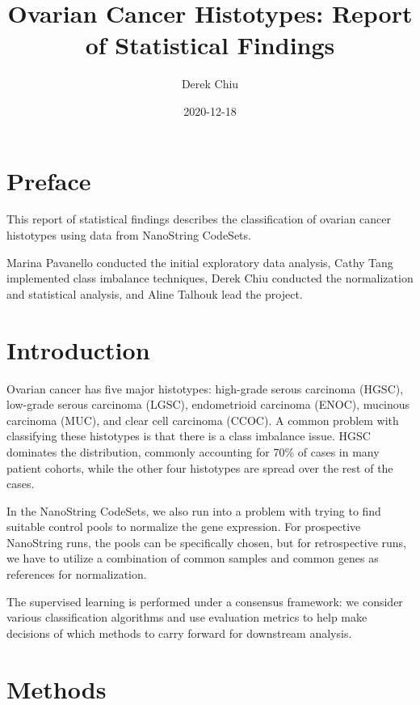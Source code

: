 \documentclass[
]{report}
\title{Ovarian Cancer Histotypes: Report of Statistical Findings}
\author{Derek Chiu}
\date{2020-12-18}
\begin{document}
\maketitle

{
\hypersetup{linkcolor=}
\setcounter{tocdepth}{1}
\tableofcontents
}
\listoftables
\listoffigures
\hypertarget{preface}{%
\chapter*{Preface}\label{preface}}

This report of statistical findings describes the classification of ovarian cancer histotypes using data from NanoString CodeSets.

Marina Pavanello conducted the initial exploratory data analysis, Cathy Tang implemented class imbalance techniques, Derek Chiu conducted the normalization and statistical analysis, and Aline Talhouk lead the project.

\hypertarget{introduction}{%
\chapter{Introduction}\label{introduction}}

Ovarian cancer has five major histotypes: high-grade serous carcinoma (HGSC), low-grade serous carcinoma (LGSC), endometrioid carcinoma (ENOC), mucinous carcinoma (MUC), and clear cell carcinoma (CCOC). A common problem with classifying these histotypes is that there is a class imbalance issue. HGSC dominates the distribution, commonly accounting for 70\% of cases in many patient cohorts, while the other four histotypes are spread over the rest of the cases.

In the NanoString CodeSets, we also run into a problem with trying to find suitable control pools to normalize the gene expression. For prospective NanoString runs, the pools can be specifically chosen, but for retrospective runs, we have to utilize a combination of common samples and common genes as references for normalization.

The supervised learning is performed under a consensus framework: we consider various classification algorithms and use evaluation metrics to help make decisions of which methods to carry forward for downstream analysis.

\hypertarget{methods}{%
\chapter{Methods}\label{methods}}
\end{document}
